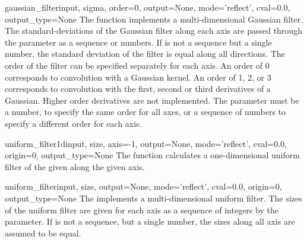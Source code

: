 \begin{funcdesc}{gaussian_filter}{input, sigma, order=0, output=None, 
  mode='reflect', cval=0.0, output_type=None} The 
   function implements a multi-dimensional 
  Gaussian filter. The standard-deviations of the Gaussian filter along 
  each axis are passed through the parameter  as a sequence or 
  numbers.  If  is not a sequence but a single number, the 
  standard deviation of the filter is equal along all directions. The 
  order of the filter can be specified separately for each axis. An order 
  of 0 corresponds to convolution with a Gaussian kernel. An order of 1, 
  2, or 3 corresponds to convolution with the first, second or
  third derivatives of a Gaussian. Higher order derivatives are not
  implemented. The  parameter must be a number, to specify the 
  same order for all axes, or a sequence of numbers to specify a different 
  order for each axis.
  
\end{funcdesc}

\begin{funcdesc}{uniform_filter1d}{input, size, axis=-1, output=None,
    mode='reflect', cval=0.0, origin=0, output_type=None} The
   function calculates a one-dimensional uniform
  filter of the given  along the given axis.
\end{funcdesc}

\begin{funcdesc}{uniform_filter}{input, size, output=None, mode='reflect', 
    cval=0.0, origin=0, output_type=None} The 
  implements a multi-dimensional uniform filter.  The sizes of the uniform 
  filter are given for each axis as a sequence of integers by the 
   parameter. If  is not a sequence, but a single 
  number, the sizes along all axis are assumed to be equal.
    
  \end{funcdesc}

